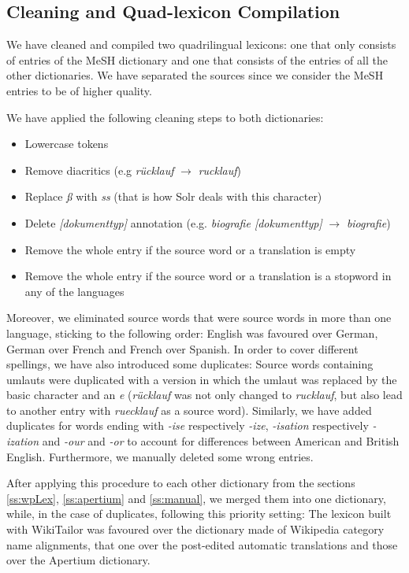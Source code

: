\documentclass[a4paper,11pt]{article}
\begin{document}
	
	\subsection{Cleaning and Quad-lexicon Compilation}
	\label{ss:cleaning}
	We have cleaned and compiled two quadrilingual lexicons: one that only consists of entries of the MeSH dictionary and one that consists of the entries of all the other dictionaries. We have separated the sources since we consider the MeSH entries to be of higher quality.
	
	We have applied the following cleaning steps to both dictionaries:
	\begin{itemize}
		\item Lowercase tokens
		\item Remove diacritics (e.g \textit{r\"ucklauf} $\rightarrow$ \textit{rucklauf})
		\item Replace \textit{\ss} with \textit{ss} (that is how Solr deals with this character)
		\item Delete \textit{[dokumenttyp]} annotation (e.g. \textit{biografie [dokumenttyp]} $\rightarrow$ \textit{biografie})
		\item Remove the whole entry if the source word or a translation is empty
		\item Remove the whole entry if the source word or a translation is a stopword in any of the languages
	\end{itemize}
	
	Moreover, we eliminated source words that were source words in more than one language, sticking to the following order: English was favoured over German, German over French and French over Spanish. In order to cover different spellings, we have also introduced some duplicates: Source words containing umlauts were duplicated with a version in which the umlaut was replaced by the basic character and an \textit{e} (\textit{rücklauf} was not only changed to \textit{rucklauf}, but also lead to another entry with \textit{ruecklauf} as a source word). Similarly, we have added duplicates for words ending with \textit{-ise} respectively \textit{-ize}, \mbox{\textit{-isation}} respectively \textit{-ization} and \textit{-our} and \textit{-or} to account for differences between American and British English. 	Furthermore, we manually deleted some wrong entries. 
	
	After applying this procedure to each other dictionary from the sections \ref{ss:wpLex}, \ref{ss:apertium} and \ref{ss:manual}, we merged them into one dictionary, while, in the case of duplicates, following this priority setting: The lexicon built with WikiTailor was favoured over the dictionary made of Wikipedia category name alignments, that one over the post-edited automatic translations and those over the Apertium dictionary.
		
\end{document}
